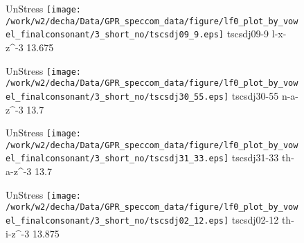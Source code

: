 \documentclass{article}
\begin{document}
\begin{figure}[t]
\begin{minipage}[b]{.24\textwidth}
UnStress
\centering
\texttt{[image: /work/w2/decha/Data/GPR\_speccom\_data/figure/lf0\_plot\_by\_vowel\_finalconsonant/3\_short\_no/tscsdj09\_9.eps]}
tscsdj09-9 l-x-z\textasciicircum-3 13.675
\end{minipage}
\begin{minipage}[b]{.24\textwidth}
UnStress
\centering
\texttt{[image: /work/w2/decha/Data/GPR\_speccom\_data/figure/lf0\_plot\_by\_vowel\_finalconsonant/3\_short\_no/tscsdj30\_55.eps]}
tscsdj30-55 n-a-z\textasciicircum-3 13.7
\end{minipage}
\begin{minipage}[b]{.24\textwidth}
UnStress
\centering
\texttt{[image: /work/w2/decha/Data/GPR\_speccom\_data/figure/lf0\_plot\_by\_vowel\_finalconsonant/3\_short\_no/tscsdj31\_33.eps]}
tscsdj31-33 th-a-z\textasciicircum-3 13.7
\end{minipage}
\begin{minipage}[b]{.24\textwidth}
UnStress
\centering
\texttt{[image: /work/w2/decha/Data/GPR\_speccom\_data/figure/lf0\_plot\_by\_vowel\_finalconsonant/3\_short\_no/tscsdj02\_12.eps]}
tscsdj02-12 th-i-z\textasciicircum-3 13.875
\end{minipage}
\end{figure}
\end{document}
